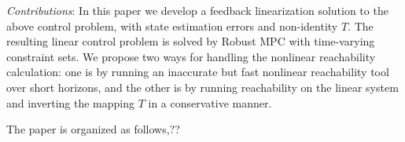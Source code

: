 \emph{Contributions}: In this paper we develop a feedback linearization solution to the above control problem, with state estimation errors and non-identity $T$.
The resulting linear control problem is solved by Robust MPC with time-varying constraint sets.
We propose two ways for handling the nonlinear reachability calculation: one is by running an inaccurate but fast nonlinear reachability tool over short horizons, and the other is by running reachability on the linear system and inverting the mapping $T$ in a conservative manner.

The paper is organized as follows,??

